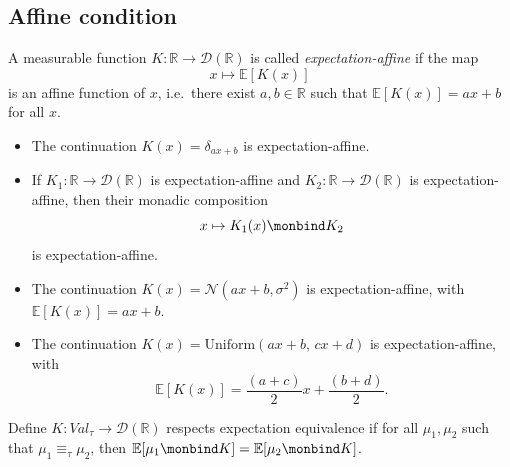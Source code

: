 \subsection{Affine condition}

\begin{definition}
  A measurable function $K : \mathbb{R} \to \mathcal{D}(\mathbb{R})$ is called \emph{expectation-affine} if the map
  \[
    x \mapsto \mathbb{E}[K(x)]
  \]
  is an affine function of $x$, i.e.\ there exist $a, b \in \mathbb{R}$ such that $\mathbb{E}[K(x)] = ax + b$ for all $x$.
\end{definition}

\begin{itemize}
  \item The continuation $K(x) = \delta_{ax+b}$ is expectation-affine. 
  \item If $K_1 : \mathbb{R} \to \mathcal{D}(\mathbb{R})$ is expectation-affine and $K_2 : \mathbb{R} \to \mathcal{D}(\mathbb{R})$ is expectation-affine, then their monadic composition
  \[
    x \mapsto K_1(x) \monbind K_2
  \]
  is expectation-affine.
  \item The continuation $K(x) = \mathcal{N}(ax + b, \sigma^2)$ is expectation-affine, with $\mathbb{E}[K(x)] = ax + b$.
  \item The continuation $K(x) = \mathrm{Uniform}(ax + b,\, cx + d)$ is expectation-affine, with
  \[
    \mathbb{E}[K(x)] = \frac{(a+c)}{2} x + \frac{(b+d)}{2}.
  \]
\end{itemize}

\begin{definition}
  Define $K \colon Val_\tau \to \mathcal{D}(\mathbb{R})$ respects expectation equivalence if for all $\mu_1, \mu_2$ such that $\mu_1 \equiv_\tau \mu_2$, then $\mathbb{E}[\mu_1 \monbind K] = \mathbb{E}[\mu_2 \monbind K]$.
\end{definition}

